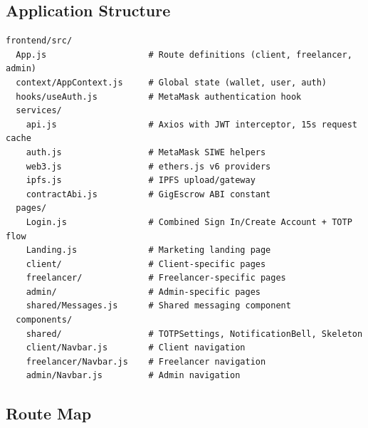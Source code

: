 \documentclass[12pt,a4paper]{article}
\begin{document}
\subsection{Application Structure}
\begin{lstlisting}[basicstyle=\ttfamily\scriptsize]
frontend/src/
  App.js                    # Route definitions (client, freelancer, admin)
  context/AppContext.js     # Global state (wallet, user, auth)
  hooks/useAuth.js          # MetaMask authentication hook
  services/
    api.js                  # Axios with JWT interceptor, 15s request cache
    auth.js                 # MetaMask SIWE helpers
    web3.js                 # ethers.js v6 providers
    ipfs.js                 # IPFS upload/gateway
    contractAbi.js          # GigEscrow ABI constant
  pages/
    Login.js                # Combined Sign In/Create Account + TOTP flow
    Landing.js              # Marketing landing page
    client/                 # Client-specific pages
    freelancer/             # Freelancer-specific pages
    admin/                  # Admin-specific pages
    shared/Messages.js      # Shared messaging component
  components/
    shared/                 # TOTPSettings, NotificationBell, Skeleton
    client/Navbar.js        # Client navigation
    freelancer/Navbar.js    # Freelancer navigation
    admin/Navbar.js         # Admin navigation
\end{lstlisting}

\subsection{Route Map}
\end{document}
